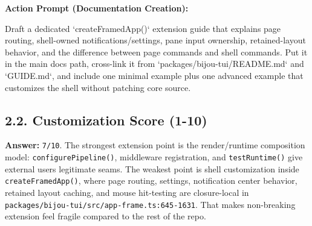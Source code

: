 \textbf{Action Prompt (Documentation Creation):}

\begin{CodeBlock}
Draft a dedicated `createFramedApp()` extension guide that explains page routing, shell-owned notifications/settings, pane input ownership, retained-layout behavior, and the difference between page commands and shell commands. Put it in the main docs path, cross-link it from `packages/bijou-tui/README.md` and `GUIDE.md`, and include one minimal example plus one advanced example that customizes the shell without patching core source.
\end{CodeBlock}

\subsection{2.2. Customization Score (1-10)}\label{record-416-customization-score-1-10}

\textbf{Answer:} \texttt{7\allowbreak{}/\allowbreak{}1\allowbreak{}0}. The strongest extension point is the render/runtime composition model: \texttt{c\allowbreak{}o\allowbreak{}n\allowbreak{}f\allowbreak{}i\allowbreak{}g\allowbreak{}u\allowbreak{}r\allowbreak{}e\allowbreak{}P\allowbreak{}i\allowbreak{}p\allowbreak{}e\allowbreak{}l\allowbreak{}i\allowbreak{}n\allowbreak{}e\allowbreak{}(\allowbreak{})}, middleware registration, and \texttt{t\allowbreak{}e\allowbreak{}s\allowbreak{}t\allowbreak{}R\allowbreak{}u\allowbreak{}n\allowbreak{}t\allowbreak{}i\allowbreak{}m\allowbreak{}e\allowbreak{}(\allowbreak{})} give external users legitimate seams. The weakest point is shell customization inside \texttt{c\allowbreak{}r\allowbreak{}e\allowbreak{}a\allowbreak{}t\allowbreak{}e\allowbreak{}F\allowbreak{}r\allowbreak{}a\allowbreak{}m\allowbreak{}e\allowbreak{}d\allowbreak{}A\allowbreak{}p\allowbreak{}p\allowbreak{}(\allowbreak{})}, where page routing, settings, notification center behavior, retained layout caching, and mouse hit-testing are closure-local in \texttt{p\allowbreak{}a\allowbreak{}c\allowbreak{}k\allowbreak{}a\allowbreak{}g\allowbreak{}e\allowbreak{}s\allowbreak{}/\allowbreak{}b\allowbreak{}i\allowbreak{}j\allowbreak{}o\allowbreak{}u\allowbreak{}-\allowbreak{}t\allowbreak{}u\allowbreak{}i\allowbreak{}/\allowbreak{}s\allowbreak{}r\allowbreak{}c\allowbreak{}/\allowbreak{}a\allowbreak{}p\allowbreak{}p\allowbreak{}-\allowbreak{}f\allowbreak{}r\allowbreak{}a\allowbreak{}m\allowbreak{}e\allowbreak{}.\allowbreak{}t\allowbreak{}s\allowbreak{}:\allowbreak{}6\allowbreak{}4\allowbreak{}5\allowbreak{}-\allowbreak{}1\allowbreak{}6\allowbreak{}3\allowbreak{}1}. That makes non-breaking extension feel fragile compared to the rest of the repo.

